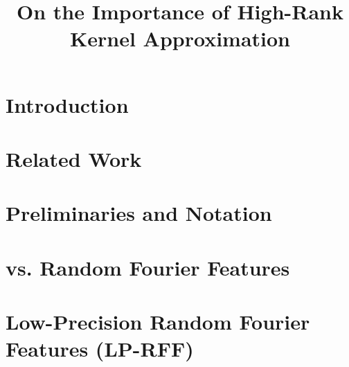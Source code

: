 \documentclass{article}
\title{On the Importance of High-Rank Kernel Approximation}
\author{
}
\begin{document}

\maketitle

\begin{abstract}



\end{abstract}

\section{Introduction}
\label{sec:intro}


\section{Related Work}
\label{sec:relwork}


\section{Preliminaries and Notation}
\label{sec:prelim}


\section{\Nystrom vs. Random Fourier Features}
\label{sec:nystromvsrff}

\section{Low-Precision Random Fourier Features (LP-RFF)}
\label{sec:lprff}






%
%
\end{document}
